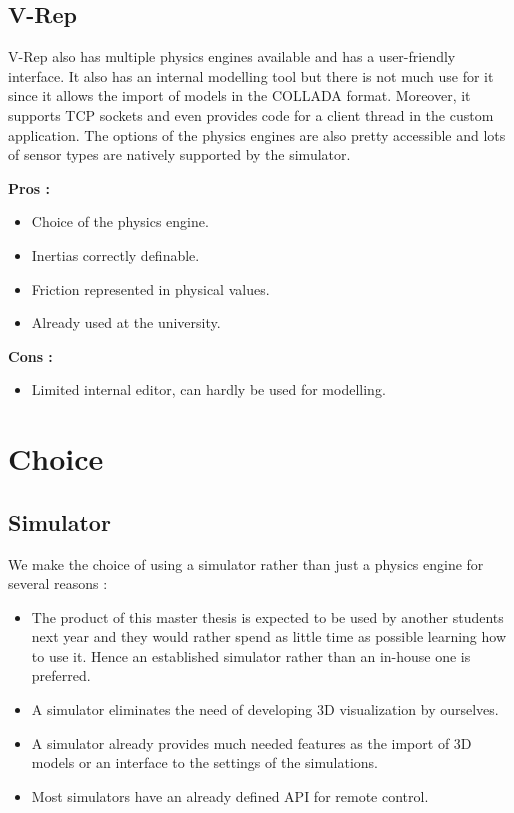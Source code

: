 \subsection{V-Rep}
V-Rep also has multiple physics engines available and has a user-friendly interface. It also has an internal modelling tool but there is not much use for it since it allows the import of models in the COLLADA format. Moreover, it supports TCP sockets and even provides code for a client thread in the custom application. The options of the physics engines are also pretty accessible and lots of sensor types are natively supported by the simulator.

\textbf{Pros :}
\begin{itemize}
\item Choice of the physics engine.
\item Inertias correctly definable.
\item Friction represented in physical values.
\item Already used at the university.
\end{itemize}

\textbf{Cons :}
\begin{itemize}
\item Limited internal editor, can hardly be used for modelling.
\end{itemize}

\section{Choice}
\subsection{Simulator}
We make the choice of using a simulator rather than just a physics engine for several reasons :\begin{itemize}
\item The product of this master thesis is expected to be used by another students next year and they would rather spend as little time as possible learning how to use it. Hence an established simulator rather than an in-house one is preferred.
\item A simulator eliminates the need of developing 3D visualization by ourselves.
\item A simulator already provides much needed features as the import of 3D models or an interface to the settings of the simulations.
\item Most simulators have an already defined API for remote control.
\end{itemize}

